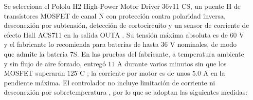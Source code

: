 \documentclass[../../General.tex]{subfiles}
\begin{document}
Se selecciona el Pololu H2 High-Power Motor Driver 36v11 CS, un puente H de transistores MOSFET de canal N con protección contra polaridad inversa, desconexión por subtensión, detección de cortocircuito y un sensor de corriente de efecto Hall ACS711 en la salida OUTA \citep{pololu_h2_36v11}. Su tensión máxima absoluta es de $60\text{ V}$ y el fabricante lo recomienda para baterías de hasta $36\text{ V}$ nominales, de modo que admite la batería 7S. En las pruebas del fabricante, a temperatura ambiente y sin flujo de aire forzado, entregó $11\text{ A}$ durante varios minutos sin que los MOSFET superaran $125^\circ\text{C}$ \citep{pololu_h2_36v11}; la corriente por motor es de unos $5.0\text{ A}$ en la pendiente máxima. El controlador no incluye limitación de corriente ni desconexión por sobretemperatura \citep{pololu_h2_36v11}, por lo que se adoptan las siguientes medidas:
\end{document}

